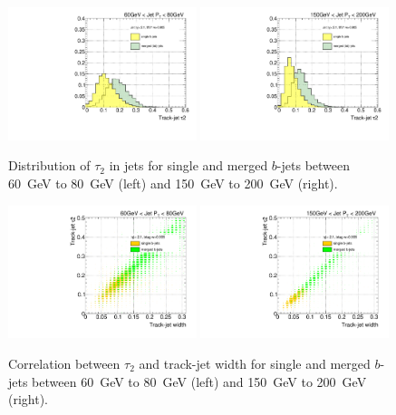 \begin{figure}[tp]
\centering
\includegraphics[width=0.49\textwidth]{FIGS/VarsSingleMerged/Tau2060.pdf}
\includegraphics[width=0.49\textwidth]{FIGS/VarsSingleMerged/Tau2150.pdf}
\caption{Distribution of $\tau_2$ in jets for single and merged $b$-jets between 60~GeV to 80~GeV (left) and 150~GeV to 200~GeV (right).}
\label{fig:tau2singlemerged}
\end{figure}


\begin{figure}[tp]
\centering
\includegraphics[width=0.49\textwidth]{FIGS/VarsSingleMerged/Tau2trkWidth060.pdf}
\includegraphics[width=0.49\textwidth]{FIGS/VarsSingleMerged/Tau2trkWidth150.pdf}
\caption{Correlation between $\tau _2$ and track-jet width for single and merged $b$-jets between 60~GeV to 80~GeV (left) and 150~GeV to 200~GeV (right).}
\label{fig:tau2trkwidthsinglemerged}
\end{figure}

